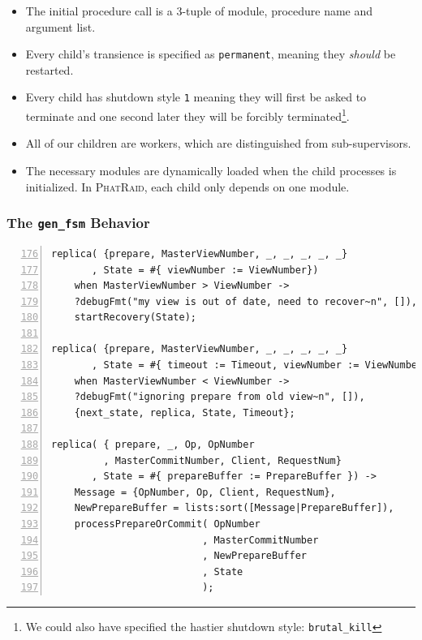 \documentclass[10pt,letter]{article}
\newcommand{\phatraid}[0]{\textsc{PhatRaid}}
\begin{document}
\begin{itemize}
\item The initial procedure call is a 3-tuple of module, procedure name and
  argument list.
\item Every child's transience is specified as \lstinline!permanent!, meaning
  they \emph{should} be restarted.
\item Every child has shutdown style \lstinline!1! meaning they will first be
  asked to terminate and one second later they will be forcibly
  terminated\footnote{We could also have specified the hastier shutdown style:
    \lstinline!brutal_kill!}.
\item All of our children are workers, which are distinguished from
  sub-supervisors.
\item The necessary modules are dynamically loaded when the child processes is
  initialized. In \phatraid{}, each child only depends on one module.
\end{itemize}

\subsubsection{The \texttt{gen\_fsm} Behavior}

\begin{lstlisting}[float,caption=The \texttt{gen\_fsm} Behavior --- \texttt{vr.erl},
                   label=lst:genfsm, numbers=left, firstnumber=176]
replica( {prepare, MasterViewNumber, _, _, _, _, _}
       , State = #{ viewNumber := ViewNumber})
    when MasterViewNumber > ViewNumber ->
    ?debugFmt("my view is out of date, need to recover~n", []),
    startRecovery(State);

replica( {prepare, MasterViewNumber, _, _, _, _, _}
       , State = #{ timeout := Timeout, viewNumber := ViewNumber})
    when MasterViewNumber < ViewNumber ->
    ?debugFmt("ignoring prepare from old view~n", []),
    {next_state, replica, State, Timeout};

replica( { prepare, _, Op, OpNumber
         , MasterCommitNumber, Client, RequestNum}
       , State = #{ prepareBuffer := PrepareBuffer }) ->
    Message = {OpNumber, Op, Client, RequestNum},
    NewPrepareBuffer = lists:sort([Message|PrepareBuffer]),
    processPrepareOrCommit( OpNumber
                          , MasterCommitNumber
                          , NewPrepareBuffer
                          , State
                          );
\end{lstlisting}
\end{document}
